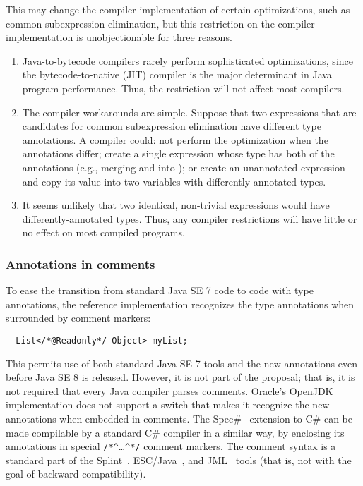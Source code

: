 \documentclass[10pt]{article}
\begin{document}
This may change the compiler implementation of certain optimizations, such
as common subexpression elimination, but this restriction on the compiler
implementation is unobjectionable for three reasons.
\begin{enumerate}
\item
Java-to-bytecode compilers rarely perform sophisticated
optimizations, since the bytecode-to-native (JIT) compiler is the major
determinant in Java program performance.  Thus, the restriction will not
affect most compilers.
\item
The compiler workarounds are simple.  Suppose that two expressions
that are candidates for common subexpression elimination
have different type annotations.
A compiler could:  not perform the optimization when the annotations
differ; create a single expression whose type has both of the annotations
(e.g., merging  and 
into );
or create an unannotated expression and copy its value into two variables
with differently-annotated types.
% 
\item
It seems unlikely that two identical, non-trivial expressions would
have differently-annotated types.  Thus, any compiler restrictions will
have little or no effect on most compiled programs.
\end{enumerate}




\subsubsection{Annotations in comments\label{annotations-in-comments}}

To ease the transition from standard Java SE 7 code to code with type
annotations, the reference implementation recognizes the type
annotations when surrounded by comment markers:

\preverbnegspace
\begin{Verbatim}
  List</*@Readonly*/ Object> myList;
\end{Verbatim}

\noindent
This permits use of both standard Java SE 7 tools and the new annotations even
before Java SE 8 is released.  However, it is not part of the proposal;
that is, it is not required that every Java compiler parses comments.
Oracle's OpenJDK implementation does not support a switch that
makes it recognize the new annotations when embedded in comments.
The Spec\#~\cite{BarnettLS2004} extension to C\# can be made compilable by
a standard C\# compiler in a similar way, by enclosing its annotations in
special \verb|/*^|\ldots\verb|^*/| comment markers.
The  comment syntax is a standard part of the
Splint~\cite{Evans96}, ESC/Java~\cite{FlanaganLLNSS02}, and
JML~\cite{LeavensBR2006:JML} tools (that is, not
with the goal of backward compatibility).
\end{document}
